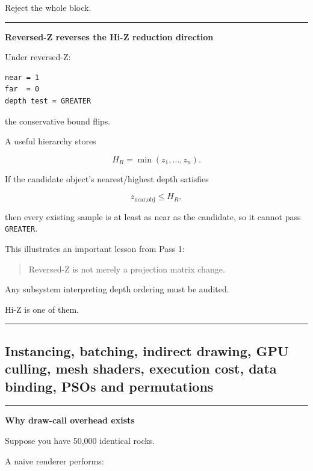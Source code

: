 Reject the whole block.

\begin{center}\rule{0.5\linewidth}{0.5pt}\end{center}

\textbf{Reversed-Z reverses the Hi-Z reduction direction}

Under reversed-Z:

\begin{verbatim}
near = 1
far  = 0
depth test = GREATER
\end{verbatim}

the conservative bound flips.

A useful hierarchy stores

\[
H_R=\min(z_1,\dots,z_n).
\]

If the candidate object's nearest/highest depth satisfies

\[
z_{\text{near,obj}}\le H_R,
\]

then every existing sample is at least as near as the candidate, so it cannot pass \texttt{GREATER}.

This illustrates an important lesson from Pass 1:

\begin{quote}
Reversed-Z is not merely a projection matrix change.
\end{quote}

Any subsystem interpreting depth ordering must be audited.

Hi-Z is one of them.

\begin{center}\rule{0.5\linewidth}{0.5pt}\end{center}

\subsection{Instancing, batching, indirect drawing, GPU culling, mesh shaders, execution cost, data binding, PSOs and permutations}\label{03-visual-computing-i-ch014-instancing-batching-indirect-drawing-gpu-culling-mesh-shaders-execution-cost-data-binding-psos-and-permutations}

\begin{center}\rule{0.5\linewidth}{0.5pt}\end{center}

\textbf{Why draw-call overhead exists}

Suppose you have 50,000 identical rocks.

A naive renderer performs:

